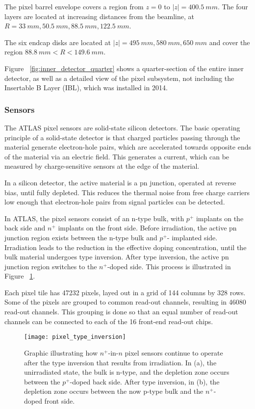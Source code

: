 The pixel barrel envelope covers a region
from $z = 0$ to $|z|  = 400.5~mm$. The four layers are located at
increasing distances from the beamline, at $R = 33~mm, 50.5~mm,
88.5~mm, 122.5~mm$.

The six endcap disks are located at $|z| = 495~mm, 580~mm, 650~mm$
and cover the region $88.8~mm < R < 149.6~mm$. \cite{atlas-detector-2008}

Figure ~\ref{fig:inner_detector_quarter} shows a quarter-section of
the entire inner detector, as well as a detailed view of the pixel
subsystem, not including the Insertable B Layer (IBL), which was
installed in 2014.

\subsubsection{Sensors}
The ATLAS pixel sensors are solid-state silicon detectors. The basic operating
principle of a solid-state detector is that charged particles passing
through the material generate electron-hole pairs, which are
accelerated towards opposite ends of the material via an electric
field. This generates a current, which can be measured by
charge-sensitive sensors at the edge of the material.\cite{spieler-2005}

In a silicon detector, the active material is a pn junction, operated
at reverse bias, until fully depleted. This reduces the thermal noise
from free charge carriers low enough that electron-hole pairs from
signal particles can be detected.\cite{spieler-2005}

In ATLAS, the pixel sensors consist of an n-type bulk, with $p^+$
implants on the back side and $n^+$ implants on the front side. Before
irradiation, the active pn junction region exists between the n-type bulk and $p^+$-
implanted side. Irradiation leads to the reduction in the effective
doping concentration, until the bulk material undergoes type
inversion. After type inversion, the active pn junction region
switches to the $n^+$-doped side.\cite{pixels-2008} This process is illustrated in
Figure ~\ref{fig:pixel_type_inversion}.

Each pixel tile has 47232 pixels, layed out in a grid of 144 columns
by 328 rows. Some of the pixels are grouped to common read-out
channels, resulting in 46080 read-out channels. This grouping is done
so that an equal number of read-out channels can be connected to each
of the 16 front-end read-out chips.

\begin{figure}[h]
\texttt{[image: pixel\_type\_inversion]}
\caption{Graphic illustrating how $n^+$-in-$n$ pixel sensors continue
  to operate after the type inversion that results from
  irradiation. In (a), the unirradiated state, the bulk is n-type, and
the depletion zone occurs between the $p^+$-doped back side. After
type inversion, in (b), the depletion zone occurs between the now
p-type bulk and the $n^+$-doped front side.\cite{pixels-2008}}
\label{fig:pixel_type_inversion}
\end{figure}
